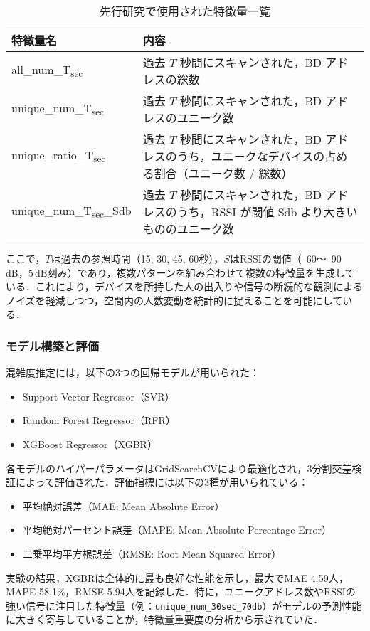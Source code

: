 \begin{table}[tb]
	\centering
	\caption{先行研究で使用された特徴量一覧}
	\label{tbl:blece_features}
	\small
	\doublerulesep=0.3pt
    \begin{tabular}{l|p{5cm}} \hline\hline\hline
		特徴量名 & 内容 \\ \hline
		all\_num\_T\textsubscript{sec} & 過去 $T$ 秒間にスキャンされた，BD アドレスの総数\\ \hline
    unique\_num\_T\textsubscript{sec} & 過去 $T$ 秒間にスキャンされた，BD アドレスのユニーク数 \\ \hline
    unique\_ratio\_T\textsubscript{sec} & 過去 $T$ 秒間にスキャンされた，BD アドレスのうち，ユニークなデバイスの占める割合（ユニーク数 / 総数） \\ \hline
    unique\_num\_T\textsubscript{sec}\_Sdb & 過去 $T$ 秒間にスキャンされた，BD アドレスのうち，RSSI が閾値 Sdb より大きいもののユニーク数 \\ \hline\hline\hline
	\end{tabular}
\end{table}

ここで，$T$は過去の参照時間（15, 30, 45, 60秒），$S$はRSSIの閾値（--60〜--90\,dB，5\,dB刻み）であり，複数パターンを組み合わせて複数の特徴量を生成している．これにより，デバイスを所持した人の出入りや信号の断続的な観測によるノイズを軽減しつつ，空間内の人数変動を統計的に捉えることを可能にしている．

\subsubsection*{モデル構築と評価}

混雑度推定には，以下の3つの回帰モデルが用いられた：

\begin{itemize}
  \item Support Vector Regressor（SVR）
  \item Random Forest Regressor（RFR）
  \item XGBoost Regressor（XGBR）
\end{itemize}

各モデルのハイパーパラメータはGridSearchCVにより最適化され，3分割交差検証によって評価された．評価指標には以下の3種が用いられている：

\begin{itemize}
  \item 平均絶対誤差（MAE: Mean Absolute Error）
  \item 平均絶対パーセント誤差（MAPE: Mean Absolute Percentage Error）
  \item 二乗平均平方根誤差（RMSE: Root Mean Squared Error）
\end{itemize}

実験の結果，XGBRは全体的に最も良好な性能を示し，最大でMAE 4.59人，MAPE 58.1\%，RMSE 5.94人を記録した．特に，ユニークアドレス数やRSSIの強い信号に注目した特徴量（例：\texttt{unique\_num\_30sec\_70db}）がモデルの予測性能に大きく寄与していることが，特徴量重要度の分析から示されていた．
